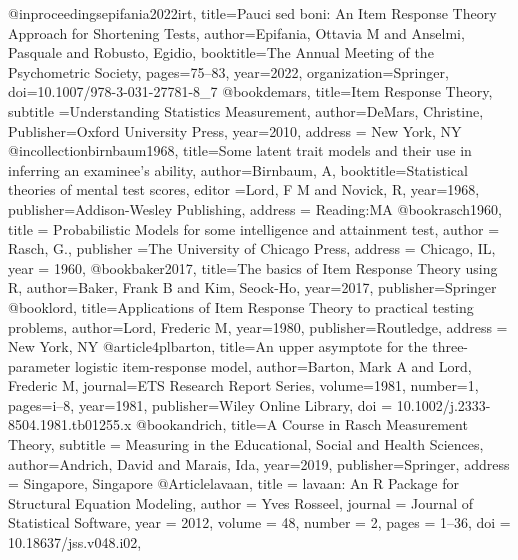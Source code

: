 @inproceedings{epifania2022irt,
  title={Pauci sed boni: An Item Response Theory Approach for Shortening Tests},
  author={Epifania, Ottavia M and Anselmi, Pasquale and Robusto, Egidio},
  booktitle={The Annual Meeting of the Psychometric Society},
  pages={75--83},
  year={2022},
  organization={Springer}, 
  doi={10.1007/978-3-031-27781-8\_7}
}
@book{demars,
  title={Item Response Theory},
subtitle ={Understanding Statistics Measurement},
  author={DeMars, Christine},
  Publisher={Oxford University Press},
  year={2010},
  address =  {New York, NY}
}
@incollection{birnbaum1968,
  title={Some latent trait models and their use in inferring an examinee's ability},
  author={Birnbaum, A},
  booktitle={Statistical theories of mental test scores},
  editor ={Lord, F M and Novick, R},
  year={1968},
  publisher={Addison-Wesley Publishing}, 
  address = {Reading:MA}
}
@book{rasch1960,
  title = {Probabilistic Models for some intelligence and attainment test},
  author = {Rasch, G.},
   publisher ={The University of Chicago Press},
  address = {Chicago, IL},
  year = {1960},
}
  @book{baker2017,
  title={{The basics of Item Response Theory using R}},
  author={Baker, Frank B and Kim, Seock-Ho},
  year={2017},
  publisher={Springer}
}
@book{lord,
  title={{Applications of Item Response Theory to practical testing problems}},
  author={Lord, Frederic M},
  year={1980},
  publisher={Routledge}, 
  address = {New York, NY}
}
@article{4plbarton,
  title={An upper asymptote for the three-parameter logistic item-response model},
  author={Barton, Mark A and Lord, Frederic M},
  journal={ETS Research Report Series},
  volume={1981},
  number={1},
  pages={i--8},
  year={1981},
  publisher={Wiley Online Library}, 
  doi = {10.1002/j.2333-8504.1981.tb01255.x}
}
@book{andrich,
  title={{A Course in Rasch Measurement Theory}},
  subtitle = {{Measuring in the Educational, Social and Health Sciences}},
  author={Andrich, David and Marais, Ida},
  year={2019},
  publisher={Springer}, 
  address = {Singapore, Singapore}
}
  @Article{lavaan,
    title = {{lavaan}: An {R} Package for Structural Equation Modeling},
    author = {Yves Rosseel},
    journal = {Journal of Statistical Software},
    year = {2012},
    volume = {48},
    number = {2},
    pages = {1--36},
    doi = {10.18637/jss.v048.i02},
  }
  
